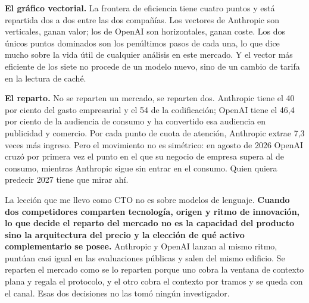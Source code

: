 \documentclass[11pt,letterpaper]{article}
\begin{document}
\textbf{El gráfico vectorial.} La frontera de eficiencia tiene cuatro puntos y
está repartida dos a dos entre las dos compañías. Los vectores de Anthropic son
verticales, ganan valor; los de OpenAI son horizontales, ganan coste. Los dos
únicos puntos dominados son los penúltimos pasos de cada una, lo que dice mucho
sobre la vida útil de cualquier análisis en este mercado. Y el vector más
eficiente de los siete no procede de un modelo nuevo, sino de un cambio de tarifa
en la lectura de caché.

\textbf{El reparto.} No se reparten un mercado, se reparten dos. Anthropic tiene
el 40 por ciento del gasto empresarial y el 54 de la codificación; OpenAI tiene
el 46,4 por ciento de la audiencia de consumo y ha convertido esa audiencia en
publicidad y comercio. Por cada punto de cuota de atención, Anthropic extrae 7,3
veces más ingreso. Pero el movimiento no es simétrico: en agosto de 2026 OpenAI
cruzó por primera vez el punto en el que su negocio de empresa supera al de
consumo, mientras Anthropic sigue sin entrar en el consumo. Quien quiera predecir
2027 tiene que mirar ahí.

La lección que me llevo como CTO no es sobre modelos de lenguaje.
\textbf{Cuando dos competidores comparten tecnología, origen y ritmo de
innovación, lo que decide el reparto del mercado no es la capacidad del producto
sino la arquitectura del precio y la elección de qué activo complementario se
posee.} Anthropic y OpenAI lanzan al mismo ritmo, puntúan casi igual en las
evaluaciones públicas y salen del mismo edificio. Se reparten el mercado como se
lo reparten porque uno cobra la ventana de contexto plana y regala el protocolo,
y el otro cobra el contexto por tramos y se queda con el canal. Esas dos
decisiones no las tomó ningún investigador.

\printbibliography[title={Referencias bibliográficas}]
\end{document}
